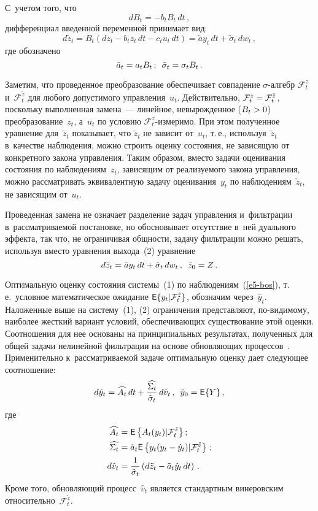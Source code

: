\begin{multicols}{2}
\pagebreak

 С~учетом того, что 
$$
dB_t= - b_t B_t\,dt\,,
$$ 
дифференциал введенной переменной принимает вид:
$$
d\tilde{z}_t= 
B_t\left(dz_t- b_t z_t\,dt- c_t u_t\,dt\right)=
 \tilde{a}y_t\,dt+ \tilde{\sigma}_t 
\,dw_t\,,
$$
 где обозначено 
 $$
 \tilde{a}_t=a_tB_t\,;\enskip \tilde{\sigma}_t=  \sigma_tB_t\,.
 $$
     
     Заметим, что проведенное преобразование обеспечивает совпадение 
$\sigma$-алгебр $\mathcal{F}_t^z$ и~$\mathcal{F}_t^{\tilde{z}}$ для любого 
допустимого управления~$u_t$. Действительно, $\mathcal{F}_t^z\hm= 
\mathcal{F}_t^{\tilde{z}}$, поскольку выполненная замена~--- линейное, 
невырожденное ($B_t\hm>0$) преобразование~$z_t$, а~$u_t$ по условию 
$\mathcal{F}_t^z$-измеримо. При этом полученное уравнение 
для~$\tilde{z}_t$ показывает, что $\tilde{z}_t$ не зависит от~$u_t$, т.\,е., 
используя~$\tilde{z}_t$ в~качестве наблюдения, можно строить оценку 
состояния, не зависящую от конкретного закона управления. Таким образом, 
вместо задачи оценивания состояния по наблюдениям~$z_t$, зависящим от 
реализуемого закона управления, можно рассматривать эквивалентную 
задачу оценивания~$y_t$ по наблюдениям~$\tilde{z}_t$, не зависящим 
от~$u_t$.
     
     Проведенная замена не означает разделение задач управления 
и~фильтрации в~рассматриваемой постановке, но обосновывает отсутствие 
в~ней дуального эффекта, так что, не ограничивая общ\-ности, задачу 
фильтрации можно решать, используя вместо уравнения выхода~(2) 
уравнение
     \begin{equation}
     d\tilde{z}_t=\tilde{a}y_t\,dt+\tilde{\sigma}_t\,dw_t\,,\enskip \tilde{z}_0=Z\,.
     \label{e5-bos}
     \end{equation}
     
     Оптимальную оценку состояния системы~(1) по наблюдениям~(\ref{e5-bos}), 
т.\,е.\ условное математическое ожидание ${\sf E}\{y_t\vert 
\mathcal{F}_t^{\tilde{z}}\}$, обозначим через~$\hat{y}_t$. Наложенные выше 
на систему~(1), (2) ограничения представляют, по-видимому, наиболее 
жесткий вариант условий, обеспечивающих существование этой оценки. 
Соотношения для нее основаны на принципиальных результатах, 
полученных для общей задачи нелинейной фильтрации на основе 
обновляющих процессов~\cite{11-bos}. Применительно к~рассматриваемой 
задаче оптимальную оценку дает следующее соотношение:
     \begin{equation}
     d\hat{y}_t= 
\widehat{A_t}\,dt+\displaystyle\frac{\displaystyle \widehat{\Sigma_t}\mathstrut}{\displaystyle \tilde{\sigma}_t\mathstrut}\,d\hat{v}_t\,,\enskip 
\hat{y}_0={\sf E}\{Y\}\,,
     \label{e6-bos}
     \end{equation}
где 
\begin{align*}
\widehat{A_t}&={\sf E}\left\{ A_t(y_t)\vert \mathcal{F}_t^{\tilde{z}}\right\};\\ 
\widehat{\Sigma_t}&= \tilde{a}_t {\sf E}\left\{ y_t(y_t\hm- \hat{y}_t)\vert 
\mathcal{F}_t^{\tilde{z}}\right\}\,;\\
d\hat{v}_t&=\fr{1}{\tilde{\sigma}_t}\left(d\tilde{z}_t- \tilde{a}_t\hat{y}_t\,dt\right)\,.
\end{align*}
Кроме того, 
обновляющий процесс~$\hat{v}_t$ является стандартным винеровским 
относительно~$\mathcal{F}_t^{\tilde{z}}$.


\end{multicols}
